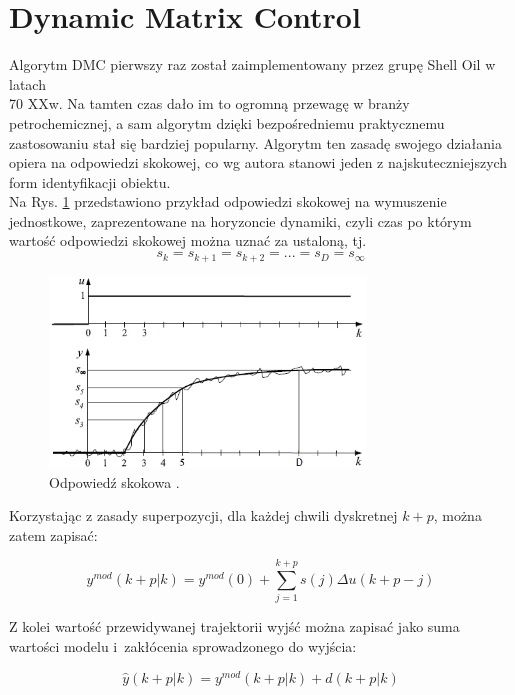 \section{Dynamic Matrix Control}
Algorytm DMC pierwszy raz został zaimplementowany przez grupę Shell Oil w latach \\ 70 XXw. Na tamten czas dało im to ogromną przewagę w branży petrochemicznej, a sam algorytm dzięki bezpośredniemu praktycznemu zastosowaniu stał się bardziej popularny. Algorytm ten zasadę swojego działania opiera na odpowiedzi skokowej, co wg autora \cite{120} stanowi jeden z najskuteczniejszych form identyfikacji obiektu. \\
Na Rys. \ref{step_response} przedstawiono przykład odpowiedzi skokowej na wymuszenie jednostkowe, zaprezentowane na horyzoncie dynamiki, czyli czas po którym wartość odpowiedzi skokowej można uznać za ustaloną, tj.
\begin{equation}
s_k = s_{k+1} = s_{k+2} = ... = s_D = s_{\infty}
\end{equation} 

\begin{figure}[h!]
\centering
\includegraphics[width=0.75\textwidth]{pictures/step_response}
\caption{Odpowiedź skokowa \cite{123}.}
\label{step_response}
\end{figure}

Korzystając z zasady superpozycji, dla każdej chwili dyskretnej $k+p$, można zatem zapisać:

\begin{equation}
y^{mod}(k+p|k) = y^{mod}(0) + \sum_{j=1}^{k+p} s(j) \Delta u(k+p-j)
\end{equation}

\newpage

Z kolei wartość przewidywanej trajektorii wyjść można zapisać jako suma wartości modelu i~zakłócenia sprowadzonego do wyjścia:

\begin{equation}
\hat{y}(k+p|k) = y^{mod}(k+p|k) + d(k+p|k)
\end{equation} 

